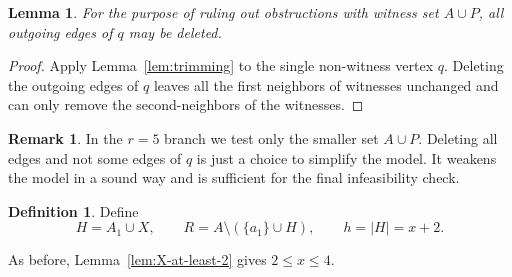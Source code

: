 \documentclass[a4paper,fleqn]{cas-sc}
\newtheorem{lemma}[theorem]{Lemma}
\theoremstyle{definition}
\newtheorem{definition}[theorem]{Definition}
\newtheorem{remark}[theorem]{Remark}
\begin{document}
\begin{lemma}\label{lem:delete-q}
For the purpose of ruling out obstructions with witness set $A\cup P$, all outgoing edges of $q$ may be deleted.
\end{lemma}
\begin{proof}
Apply Lemma~\ref{lem:trimming} to the single non-witness vertex $q$. Deleting the outgoing edges of $q$ leaves all the first neighbors of witnesses unchanged and can only remove the second-neighbors of the witnesses.
\end{proof}

\begin{remark}
    In the \(r=5\) branch we test only the smaller set \(A\cup P\). Deleting all edges and not some edges of $q$ is just a choice to simplify the model. It weakens the model in a sound way and is sufficient for the final infeasibility check.
\end{remark}

\begin{definition} Define
    \[
H=A_1\cup X,
\qquad R=A\setminus(\{a_1\}\cup H),
\qquad h=|H|=x+2.
\]
\end{definition}

As before, Lemma~\ref{lem:X-at-least-2} gives $2\le x\le 4$.
\end{document}
